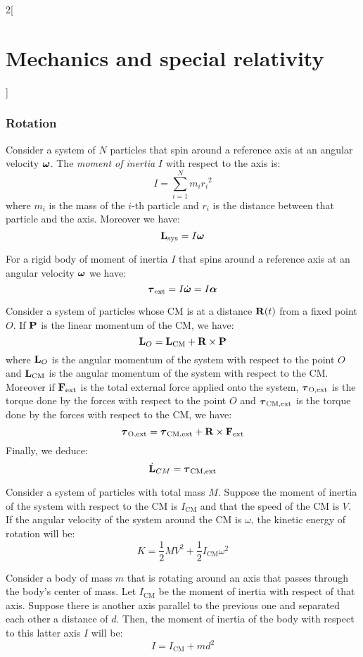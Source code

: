 \documentclass[../../../main.tex]{subfiles}
\begin{document}
\begin{multicols}{2}[\section{Mechanics and special relativity}]
  \subsubsection{Rotation}
  \begin{definition}
    Consider a system of $N$ particles that spin around a reference axis at an angular velocity $\vb*{\omega}$. The \textit{moment of inertia} $I$ with respect to the axis is: $$I=\sum_{i=1}^Nm_i{r_i}^2$$
    where $m_i$ is the mass of the $i$-th particle and $r_i$ is the distance between that particle and the axis. Moreover we have: $$\boldsymbol{\mathrm{L}}_\text{sys}=I\vb*{\omega}$$
  \end{definition}
  \begin{prop}
    For a rigid body of moment of inertia $I$ that spins around a reference axis at an angular velocity $\vb*{\omega}$ we have: $$\vb*{\tau}_\text{ext}=I\dot{\vb*{\omega}}=I\vb*{\alpha}$$
  \end{prop}
  \begin{prop}
    Consider a system of particles whose CM is at a distance $\boldsymbol{\mathrm{R}}(t)$ from a fixed point $O$. If $\boldsymbol{\mathrm{P}}$ is the linear momentum of the CM, we have: $$\boldsymbol{\mathrm{L}}_O=\boldsymbol{\mathrm{L}}_\text{CM}+\boldsymbol{\mathrm{R}}\times\boldsymbol{\mathrm{P}}$$ where $\boldsymbol{\mathrm{L}}_O$ is the angular momentum of the system with respect to the point $O$ and $\boldsymbol{\mathrm{L}}_\text{CM}$ is the angular momentum of the system with respect to the CM. Moreover if $\boldsymbol{\mathrm{F}}_\text{ext}$ is the total external force applied onto the system, $\vb*{\tau}_\text{O,ext}$ is the torque done by the forces with respect to the point $O$ and $\vb*{\tau}_\text{CM,ext}$ is the torque done by the forces with respect to the CM, we have: $$\vb*{\tau}_\text{O,ext}=\vb*{\tau}_\text{CM,ext}+\boldsymbol{\mathrm{R}}\times\boldsymbol{\mathrm{F}}_\text{ext}$$ Finally, we deduce: $$\dot{\boldsymbol{\mathrm{L}}}_{CM}=\vb*{\tau}_\text{CM,ext}$$
  \end{prop}
  \begin{prop}
    Consider a system of particles with total mass $M$. Suppose the moment of inertia of the system with respect to the CM is $I_\text{CM}$ and that the speed of the CM is $V$. If the angular velocity of the system around the CM is $\omega$, the kinetic energy of rotation will be: $$K=\frac{1}{2}MV^2+\frac{1}{2}I_\text{CM}\omega^2$$
  \end{prop}
  \begin{theorem}
    Consider a body of mass $m$ that is rotating around an axis that passes through the body's center of mass. Let $I_\text{CM}$ be the moment of inertia with respect of that axis. Suppose there is another axis parallel to the previous one and separated each other a distance of $d$. Then, the moment of inertia of the body with respect to this latter axis $I$ will be:
    $$I=I_\text{CM}+md^2$$
  \end{theorem}

\end{multicols}
\end{document}
